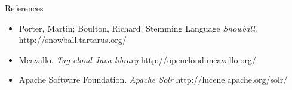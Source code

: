 \documentclass[a0paper, portrait]{baposter}
\begin{document}
\begin{poster}
{  }
  
  \begin{posterbox}[column=2, name=ref, below=future, column=2] {References} {
    \begin{itemize}
     \item Porter, Martin; Boulton, Richard. Stemming Language {\em Snowball}. http://snowball.tartarus.org/
     \item Mcavallo. {\em Tag cloud Java library} http://opencloud.mcavallo.org/ 
     \item Apache Software Foundation. {\em Apache Solr} http://lucene.apache.org/solr/
    \end{itemize}   
    }
  \end{posterbox}

\end{poster}
\end{document}

